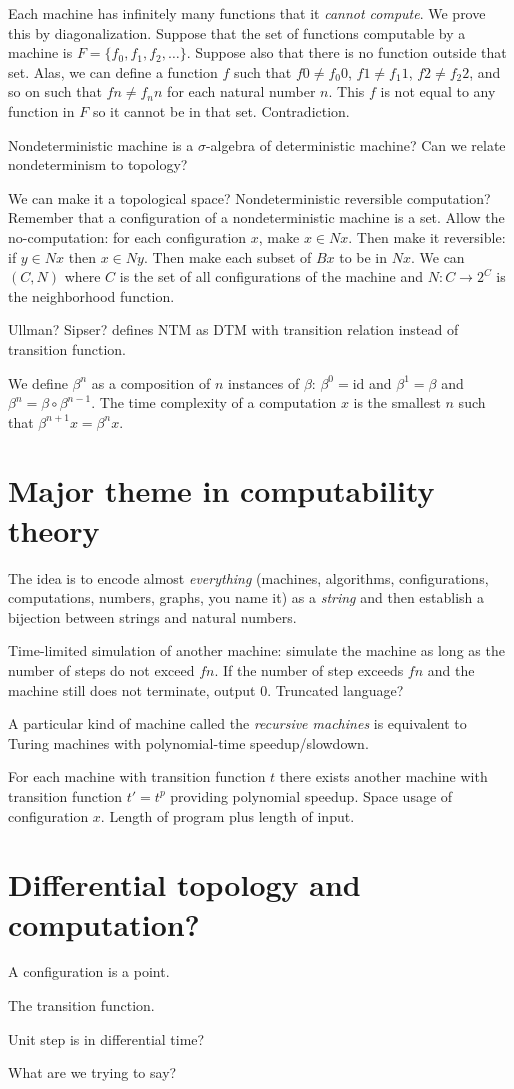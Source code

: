 Each machine has infinitely many functions that it \emph{cannot compute}.
We prove this by diagonalization.
Suppose that the set of functions computable by a machine is $F = \{ f_0, f_1, f_2, \ldots \}$.
Suppose also that there is no function outside that set.
Alas, we can define a function $f$
such that $f0 \neq f_0 0$, $f1 \neq f_1 1$, $f2 \neq f_2 2$, and so on
such that $fn \neq f_n n$ for each natural number $n$.
This $f$ is not equal to any function in $F$ so it cannot be in that set.
Contradiction.

Nondeterministic machine is a $\sigma$-algebra of deterministic machine?
Can we relate nondeterminism to topology?

We can make it a topological space?
Nondeterministic reversible computation?
Remember that a configuration of a nondeterministic machine is a set.
Allow the no-computation: for each configuration $x$, make $x \in N x$.
Then make it reversible:
if $y \in N x$ then $x \in N y$.
Then make each subset of $B x$ to be in $N x$.
We can $(C,N)$ where $C$ is the set of all configurations of the machine
and $N : C \to 2^C$ is the neighborhood function.

Ullman? Sipser? defines NTM as DTM with transition relation instead of transition function.

We define $\beta^n$ as a composition of $n$ instances of $\beta$:
$\beta^0 = \text{id}$ and $\beta^1 = \beta$ and $\beta^n = \beta \circ \beta^{n-1}$.
The time complexity of a computation $x$
is the smallest $n$ such that $\beta^{n+1} x = \beta^n x$.

\section{Major theme in computability theory}

The idea is to encode almost \emph{everything}
(machines, algorithms, configurations, computations, numbers, graphs, you name it)
as a \emph{string} and then establish a bijection between strings and natural numbers.

Time-limited simulation of another machine:
simulate the machine as long as the number of steps do not exceed $f n$.
If the number of step exceeds $f n$ and the machine still does not terminate,
output $0$.
Truncated language?

A particular kind of machine called the \emph{recursive machines}
is equivalent to Turing machines with polynomial-time speedup/slowdown.

For each machine with transition function $t$ there exists another machine
with transition function $t' = t^p$
providing polynomial speedup.
Space usage of configuration $x$.
Length of program plus length of input.

\section{Differential topology and computation?}

A configuration is a point.

The transition function.

Unit step is in differential time?

What are we trying to say?
